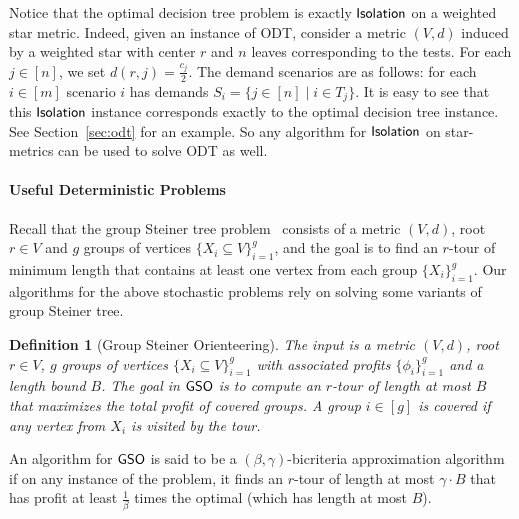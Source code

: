 \documentclass[11pt]{article}
\newtheorem{definition}{Definition}
\def\sse{\subseteq}
\def\odt{{\sf ODT}\xspace}
\newcommand{\profit}{\phi}
\def\isoprob{\ensuremath{{\sf Isolation}}\xspace}
\def\gso{\ensuremath{{\sf GSO}}\xspace}
\begin{document}
Notice that the optimal decision tree problem is exactly \isoprob on a weighted star metric. Indeed, given an instance of \odt, consider a metric $(V,d)$ induced by a weighted star with  center $r$ and $n$ leaves corresponding to the tests. For each $j\in
  [n]$, we set $d(r,j)=\frac{c_j}2$. The demand scenarios are as
  follows: for each $i\in [m]$ scenario $i$ has demands $S_i=\{j\in [n]\mid i\in T_j\}$.
  It is easy to see that this \isoprob instance corresponds
  exactly to the optimal decision tree instance. See  Section~\ref{sec:odt} for an example. So any algorithm for  \isoprob on star-metrics can be used to solve \odt as well. 





\paragraph{Useful Deterministic Problems} Recall that the group Steiner tree problem~\cite{gkr,hk03} consists of a metric $(V,d)$, root $r\in V$ and $g$ groups of 
vertices $\{X_i\sse V\}_{i=1}^g$, and the goal is to find an $r$-tour of minimum length that contains at least one vertex from each group $\{X_i\}_{i=1}^g$.  Our algorithms for the above stochastic problems rely on solving some variants of group Steiner tree. 

\begin{definition}[Group Steiner Orienteering]\label{def:gso}
The input is a metric $(V,d)$, root $r\in V$, $g$ groups of 
vertices $\{X_i\sse V\}_{i=1}^g$ with associated profits $\{\profit_i\}_{i=1}^g$ and a length bound $B$. The goal in \gso is
to compute an $r$-tour of length at most $B$ that maximizes the total profit of covered groups. A group $i\in[g]$
is covered if any vertex from $X_i$ is visited by the tour. 
\end{definition}
\smallskip
An algorithm for \gso is said to be a  $(\beta,\gamma)$-bicriteria approximation algorithm if on any instance of the problem, it finds an $r$-tour of length at most $\gamma\cdot B$ that has profit at least $\frac{1}{\beta}$ times the optimal (which has length at most $B$). 

\smallskip
\end{document}
